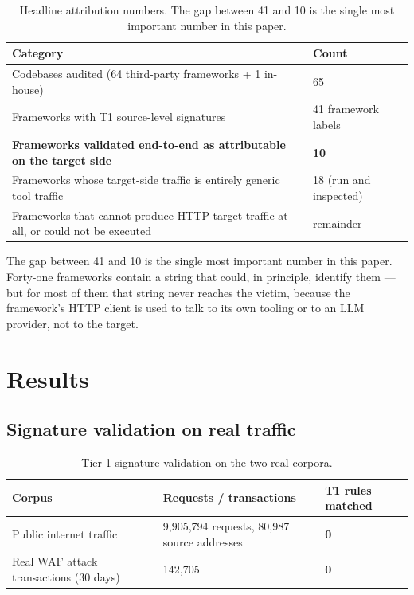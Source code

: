 \documentclass[11pt]{article}
\begin{document}
\begin{table}[t]
\centering
\caption{Headline attribution numbers. The gap between 41 and 10 is the single most important
number in this paper.}
\label{tab:attribution}
\begin{tabularx}{\textwidth}{@{}Y R{0.18\textwidth}@{}}
\toprule
\textbf{Category} & \textbf{Count} \\
\midrule
Codebases audited (64 third-party frameworks + 1 in-house) & 65 \\
Frameworks with T1 source-level signatures & 41 framework labels \\
\textbf{Frameworks validated end-to-end as attributable on the target side} & \textbf{10} \\
Frameworks whose target-side traffic is entirely generic tool traffic & 18 (run and inspected) \\
Frameworks that cannot produce HTTP target traffic at all, or could not be executed & remainder \\
\bottomrule
\end{tabularx}
\end{table}

The gap between 41 and 10 is the single most important number in this paper. Forty-one
frameworks contain a string that could, in principle, identify them --- but for most of them
that string never reaches the victim, because the framework's HTTP client is used to talk to
its own tooling or to an LLM provider, not to the target.

\section{Results}
\label{sec:results}

\subsection{Signature validation on real traffic}
\label{sec:validation}

\begin{table}[t]
\centering
\caption{Tier-1 signature validation on the two real corpora.}
\label{tab:validation}
\begin{tabularx}{\textwidth}{@{}Y L{0.40\textwidth} R{0.16\textwidth}@{}}
\toprule
\textbf{Corpus} & \textbf{Requests / transactions} & \textbf{T1 rules matched} \\
\midrule
Public internet traffic & 9,905,794 requests, 80,987 source addresses & \textbf{0} \\
Real WAF attack transactions (30 days) & 142,705 & \textbf{0} \\
\bottomrule
\end{tabularx}
\end{table}
\end{document}
